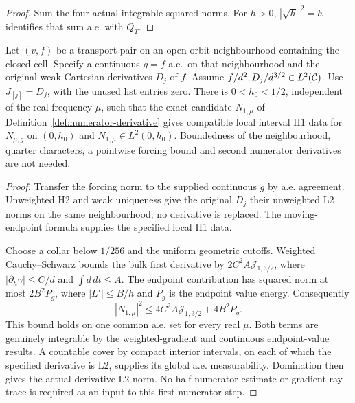 \begin{proof}
\leanok
Sum the four actual integrable squared norms.
For $h>0$, $|\sqrt h|^2=h$ identifies that sum a.e. with $Q_T$.
\end{proof}

\begin{lemma}
\label{lem:weighted-first-numerator}
\leanok
Let $(v,f)$ be a transport pair on an open orbit neighbourhood containing
the closed cell. Specify a continuous $g=f$ a.e.\ on that neighbourhood
and the original weak Cartesian derivatives $D_j$ of $f$.
Assume $f/d^2,D_j/d^{3/2}\in L^2(\mathcal{C})$.
Use $J_{[j]}=D_j$, with the unused list entries zero.
There is $0<h_0<1/2$, independent of the real frequency $\mu$,
such that the exact candidate $N_{1,\mu}$ of
Definition~\ref{def:numerator-derivative} gives compatible local
interval H1 data for $N_{\mu,g}$ on $(0,h_0)$ and
$N_{1,\mu}\in L^2(0,h_0)$.
Boundedness of the neighbourhood, quarter characters, a pointwise
forcing bound and second numerator derivatives are not needed.
\end{lemma}

\begin{proof}
\leanok
Transfer the forcing norm to the supplied continuous $g$ by a.e. agreement.
Unweighted H2 and weak uniqueness give the original $D_j$ their unweighted
L2 norms on the same neighbourhood; no derivative is replaced.
The moving-endpoint formula supplies the specified local H1 data.

Choose a collar below $1/256$ and the uniform geometric cutoffs.
Weighted Cauchy--Schwarz bounds the bulk first derivative by
$2C^2A\mathcal J_{1,3/2}$, where
$|\partial_h\gamma|\le C/d$ and $\int d\,dt\le A$.
The endpoint contribution has squared norm at most $2B^2P_g$,
where $|L'|\le B/h$ and $P_g$ is the endpoint value energy.
Consequently
\[
 |N_{1,\mu}|^2\le4C^2A\mathcal J_{1,3/2}+4B^2P_g .
\]
This bound holds on one common a.e. set for every real $\mu$.
Both terms are genuinely integrable by the weighted-gradient and
continuous endpoint-value results.
A countable cover by compact interior intervals, on each of which the
specified derivative is L2, supplies its global a.e. measurability.
Domination then gives the actual derivative L2 norm. No half-numerator estimate
or gradient-ray trace is required as an input to this first-numerator step.
\end{proof}

